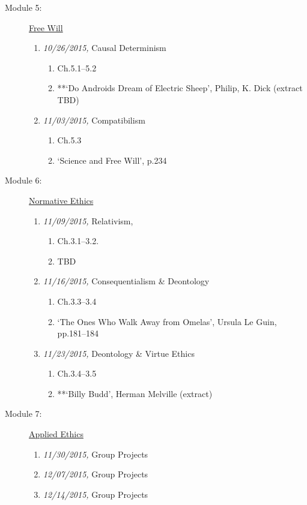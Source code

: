 \documentclass[article,oneside]{memoir}
\begin{document}
\begin{description}
\item[Module 5:] \href{http://scoconno.github.io/Teaching/Examined/FreeWill/}{Free Will}

\begin{enumerate}
\item \textit{10/26/2015,}  Causal Determinism
\begin{enumerate}
\item Ch.5.1--5.2
\item **`Do Androids Dream of Electric Sheep', Philip, K. Dick (extract TBD)
\end{enumerate}

\item \textit{11/03/2015,} Compatibilism
\begin{enumerate}
\item Ch.5.3
\item `Science and Free Will', p.234
\end{enumerate}

\end{enumerate}

\item[Module 6:] \href{http://scoconno.github.io/Teaching/Examined/Ethics/}{Normative Ethics}
\begin{enumerate}

\item \textit{11/09/2015,} Relativism, 
\begin{enumerate}
\item Ch.3.1--3.2.
\item TBD
\end{enumerate}
\item \textit{11/16/2015,} Consequentialism \& Deontology 
\begin{enumerate}
\item Ch.3.3--3.4
\item  `The Ones Who Walk Away from Omelas', Ursula Le Guin, pp.181--184 
\end{enumerate}
\item \textit{11/23/2015,} Deontology \& Virtue Ethics
\begin{enumerate}
\item Ch.3.4--3.5
\item **`Billy Budd', Herman Melville (extract)
\end{enumerate}

\end{enumerate}

\item[Module 7:] \href{http://scoconno.github.io/Teaching/Examined/Applied/}{Applied Ethics}
\begin{enumerate}
\item \textit{11/30/2015,} Group Projects
\item \textit{12/07/2015,} Group Projects
\item \textit{12/14/2015,} Group Projects
\end{enumerate}

\end{description}
\end{document}
